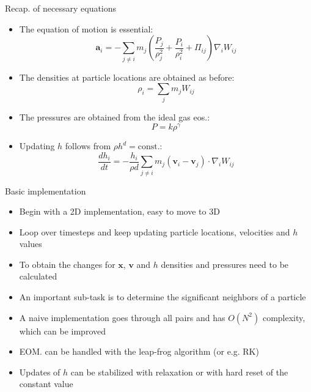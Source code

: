 \documentclass{beamer}
\begin{document}
\begin{frame}{Recap. of necessary equations}
\begin{itemize}

\item The equation of motion is essential:
\begin{equation}
 \mathbf{a}_i = -\sum_{j \neq i} m_j \left( \frac{P_j}{\rho_j^2} + \frac{P_i}{\rho_i^2} + \Pi_{ij} \right) \nabla_i W_{ij} 
\end{equation}
\item The densities at particle locations are obtained as before:
\begin{equation}
\rho_i = \sum_j m_j W_{ij}
\end{equation}
\item The pressures are obtained from the ideal gas eos.:
\begin{equation}
 P = k \rho^\gamma
\end{equation}
\item Updating $h$ follows from $\rho h^d = \text{const.}$:
\begin{equation}
 \frac{d h_i}{dt} = -\frac{h_i}{\rho d} \sum_{j \neq i} m_j ( \mathbf{v}_i - \mathbf{v}_j ) \cdot \nabla_i W_{ij}
\end{equation}

\end{itemize}
\end{frame}

\begin{frame}{Basic implementation}
\begin{itemize}

\item Begin with a 2D implementation, easy to move to 3D
\item Loop over timesteps and keep updating particle locations, velocities and $h$ values
\item To obtain the changes for $\mathbf{x}$, $\mathbf{v}$ and $h$ densities and pressures need to be calculated
\item An important sub-task is to determine the significant neighbors of a particle
\item A naive implementation goes through all pairs and has $O(N^2)$ complexity, which can be improved
\item EOM. can be handled with the leap-frog algorithm (or e.g. RK)
\item Updates of $h$ can be stabilized with relaxation or with hard reset of the constant value

\end{itemize}
\end{frame}
\end{document}
